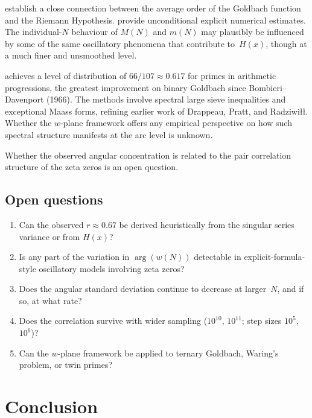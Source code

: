 \documentclass[11pt,a4paper]{article}
\newcommand{\MN}{M(N)}
\newcommand{\mN}{m(N)}
\newcommand{\wN}{w(N)}
\begin{document}
\citet{BhowmikRuzsa2014} establish a close connection between the average order of the Goldbach function and the Riemann Hypothesis. \citet{BhowmikErnvallPalojarvi2025} provide unconditional explicit numerical estimates. The individual-$N$ behaviour of $\MN$ and $\mN$ may plausibly be influenced by some of the same oscillatory phenomena that contribute to~$H(x)$, though at a much finer and unsmoothed level.

\citet{Lichtman2023} achieves a level of distribution of $66/107 \approx 0.617$ for primes in arithmetic progressions, the greatest improvement on binary Goldbach since Bombieri--Davenport (1966). The methods involve spectral large sieve inequalities and exceptional Maass forms, refining earlier work of Drappeau, Pratt, and Radziwi{\l\l}. Whether the $w$-plane framework offers any empirical perspective on how such spectral structure manifests at the arc level is unknown.

Whether the observed angular concentration is related to the pair correlation structure of the zeta zeros \citep{Montgomery1973, GoldstonSuriajaya2023} is an open question.


\subsection{Open questions}

\begin{enumerate}
\item Can the observed $r \approx 0.67$ be derived heuristically from the singular series variance or from $H(x)$?
\item Is any part of the variation in $\arg(\wN)$ detectable in explicit-formula-style oscillatory models involving zeta zeros?
\item Does the angular standard deviation continue to decrease at larger~$N$, and if so, at what rate?
\item Does the correlation survive with wider sampling ($10^{10}$, $10^{11}$; step sizes $10^5$, $10^6$)?
\item Can the $w$-plane framework be applied to ternary Goldbach, Waring's problem, or twin primes?
\end{enumerate}



\section{Conclusion}
\end{document}
